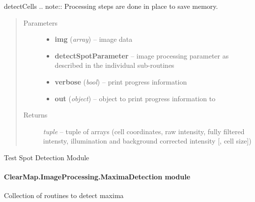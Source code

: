 \documentclass[letterpaper,10pt,english]{sphinxmanual}
\begin{document}
\begin{fulllineitems}
\begin{description}
\begin{itemize}
\end{itemize}

\end{description}

detectCells
.. note:: Processing steps are done in place to save memory.
\begin{quote}\begin{description}
\item[{Parameters}] \leavevmode\begin{itemize}
\item {} 
\textbf{img} (\emph{array}) --
image data

\item {} 
\textbf{detectSpotParameter} --
image processing parameter as described in the individual sub-routines

\item {} 
\textbf{verbose} (\emph{bool}) --
print progress information

\item {} 
\textbf{out} (\emph{object}) --
object to print progress information to

\end{itemize}

\item[{Returns}] \leavevmode
\emph{tuple} --
tuple of arrays (cell coordinates, raw intensity, fully filtered intensty, illumination and background corrected intensity {[}, cell size{]})

\end{description}\end{quote}

\end{fulllineitems}


\begin{fulllineitems}
\label{api/ClearMap.ImageProcessing:ClearMap.ImageProcessing.SpotDetection.test}
Test Spot Detection Module

\end{fulllineitems}



\paragraph{ClearMap.ImageProcessing.MaximaDetection module}
\label{api/ClearMap.ImageProcessing:module-ClearMap.ImageProcessing.MaximaDetection}\label{api/ClearMap.ImageProcessing:clearmap-imageprocessing-maximadetection-module}
Collection of routines to detect maxima
\end{document}
